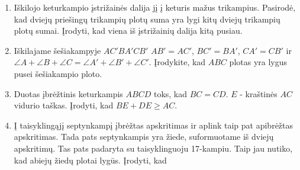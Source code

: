 \begin{enumerate}
\item Iškilojo keturkampio įstrižainės dalija jį į keturis
  mažus trikampius. Pasirodė, kad dviejų priešingų trikampių
  plotų suma yra lygi kitų dviejų trikampių plotų sumai.
  Įrodyti, kad viena iš įstrižainių dalija kitą pusiau.
\item Iškilajame šešiakampyje $AC'BA'CB'$  $AB'=AC'$,
  $BC'=BA'$, $CA'=CB'$ ir $\angle A+\angle B+\angle C=\angle
  A'+\angle B'+\angle C'$. Įrodykite, kad $ABC$ plotas yra
  lygus pusei šešiakampio ploto. 
\item Duotas įbrėžtinis keturkampis $ABCD$ toks, kad
  $BC=CD$. $E$ - kraštinės $AC$ vidurio taškas. Įrodyti, kad
  $BE+DE\geq AC$.
\item Į taisyklingąjį septynkampį įbrėžtas apskritimas ir
  aplink taip pat apibrėžtas apskritimas. Tada pats
  septynkampis yra žiede, suformuotame iš dviejų apskritimų.
  Tas pats padaryta su taisyklinguoju 17-kampiu. Taip jau
  nutiko, kad abiejų žiedų plotai lygūs. Įrodyti, kad

\end{enumerate}

